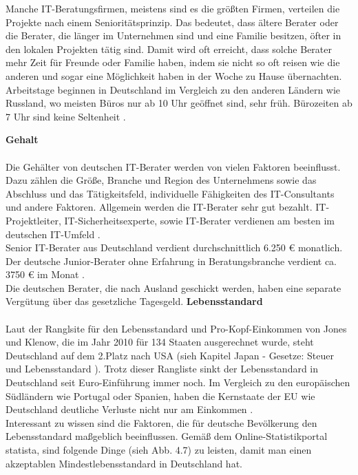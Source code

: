 	Manche IT-Beratungsfirmen, meistens sind es die größten Firmen, verteilen die Projekte nach einem Senioritätsprinzip. Das bedeutet, dass ältere Berater oder die Berater, die länger im Unternehmen sind und eine Familie besitzen, öfter in den lokalen Projekten tätig sind. Damit wird oft erreicht, dass solche Berater mehr Zeit für Freunde oder Familie haben, indem sie nicht so oft reisen wie die anderen und sogar eine Möglichkeit haben in der Woche zu Hause übernachten.\\
	Arbeitstage beginnen in Deutschland im Vergleich zu den anderen Ländern wie Russland, wo meisten Büros nur ab 10 Uhr geöffnet sind, sehr früh. Bürozeiten ab 7 Uhr sind keine Seltenheit \cite{ArbKulturDE}. %
	
	\textbf{Gehalt} \\ \\
	Die Gehälter von deutschen IT-Berater werden von vielen Faktoren beeinflusst. Dazu zählen die Größe, Branche und Region des Unternehmens sowie das Abschluss und das Tätigkeitsfeld, individuelle Fähigkeiten des IT-Consultants und andere Faktoren. Allgemein werden die IT-Berater sehr gut bezahlt. IT-Projektleiter, IT-Sicherheitsexperte, sowie IT-Berater verdienen am besten im deutschen IT-Umfeld \cite{VerdienstITinDE}.\\
	Senior IT-Berater aus Deutschland verdient durchschnittlich 6.250 € monatlich. Der deutsche Junior-Berater ohne Erfahrung in Beratungsbranche verdient ca. 3750 € im Monat .\cite{GehaltSAPBerDE} \\
	Die deutschen Berater, die nach Ausland geschickt werden, haben eine separate Vergütung über das gesetzliche Tagesgeld.
	\newpage
	\textbf{Lebensstandard} \\ \\
	Laut der Ranglsite für den Lebensstandard und Pro-Kopf-Einkommen von Jones und Klenow, die im Jahr 2010 für 134 Staaten ausgerechnet wurde, steht Deutschland auf dem 2.Platz nach USA (sieh Kapitel Japan - Gesetze: Steuer und Lebensstandard \label{LebStdProKEink}). Trotz dieser Rangliste sinkt der Lebensstandard in Deutschland seit Euro-Einführung immer noch. Im Vergleich zu den europäischen Südländern wie Portugal oder Spanien, haben die Kernstaate der EU wie Deutschland deutliche Verluste nicht nur am Einkommen \cite{SteigungDELebstd}.\\
	Interessant zu wissen sind die Faktoren, die für deutsche Bevölkerung den Lebensstandard maßgeblich beeinflussen. Gemäß dem Online-Statistikportal statista, sind folgende Dinge (sieh Abb. 4.7) zu leisten, damit man einen akzeptablen Mindestlebensstandard in Deutschland hat.

